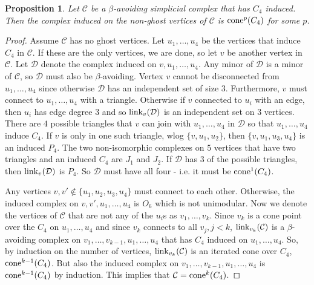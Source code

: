 \documentclass[letterpaper,12pt]{amsart}
\theoremstyle{plain}
\newtheorem{prop}[thm]{Proposition}
\theoremstyle{definition}
\theoremstyle{remark}
\newcommand{\calc}{\mathcal{C}}
\newcommand{\link}{\textnormal{link}}
\newcommand{\cone}{\textnormal{cone}}
\begin{document}
\begin{prop}\label{square}
	Let $\mathcal{C}$ be a $\beta$-avoiding simplicial complex that has $C_4$ induced.
	Then the complex induced on the non-ghost vertices of $\mathcal{C}$ is $\cone^p(C_4)$
	for some $p$.
\end{prop}

\begin{proof}
	Assume $\mathcal{C}$ has no ghost vertices.
	Let $u_1,\dots,u_4$ be the vertices that induce $C_4$ in $\mathcal{C}$.
	If these are the only vertices, we are done, so let $v$ be another vertex in $\mathcal{C}$.
	Let $\mathcal{D}$ denote the complex induced on $v,u_1,\dots,u_4$.
	Any minor of $\mathcal{D}$ is a minor of $\mathcal{C}$, so $\mathcal{D}$ must also be $\beta$-avoiding.
	Vertex $v$ cannot be disconnected from $u_1,\dots,u_4$ since otherwise $\mathcal{D}$ has an independent set of size $3$.
	Furthermore, $v$ must connect to $u_1,\dots,u_4$ with a triangle.
	Otherwise if $v$ connected to $u_i$ with an edge, then $u_i$ has edge degree 3
	and so $\link_v(\mathcal{D})$ is an independent set on $3$ vertices.
	There are $4$ possible triangles that $v$ can join with $u_1,\dots,u_4$ in $\mathcal{D}$
	so that $u_1,\dots,u_4$ induce $C_4$.
	If $v$ is only in one such triangle, wlog $\{v,u_1,u_2\}$,
	then $\{v,u_1,u_3,u_4\}$ is an induced $P_4$.
	The two non-isomorphic complexes on $5$ vertices that have two triangles and an induced $C_4$ are $J_1$ and $J_2$.
	If $\mathcal{D}$ has $3$ of the possible triangles, then $\link_v(\mathcal{D})$ is $P_4$.
	So $\mathcal{D}$ must have all four - i.e. it must be $\cone^1(C_4)$.

	Any vertices $v,v' \notin \{u_1, u_2, u_3, u_4\}$ must connect to each other.
	Otherwise, the induced complex on $v,v',u_1,\dots,u_4$ is $O_6$ which is 
	not unimodular.
	Now we denote the vertices of $\mathcal{C}$ that are not any of the $u_i$s as $v_1,\dots,v_k$.
	Since $v_k$ is a cone point over the $C_4$ on $u_1,\dots,u_4$ and since $v_k$ connects to all $v_j, j<k$,
	$\link_{v_k}(\calc)$ is a $\beta$-avoiding complex on $v_1,\dots,v_{k-1},u_1,\dots,u_4$ that has $C_4$ induced on $u_1,\dots,u_4$.
	So, by induction on the number of vertices, $\link_{v_k}(\calc)$ is an iterated cone over $C_4$, $\cone^{k-1}(C_4)$.
	But also the induced complex on $v_1,\dots,v_{k-1},u_1,\dots,u_4$ is 
	$\cone^{k-1}(C_4)$ by induction.  This implies that $\calc = \cone^k(C_4)$.
\end{proof}
\end{document}
